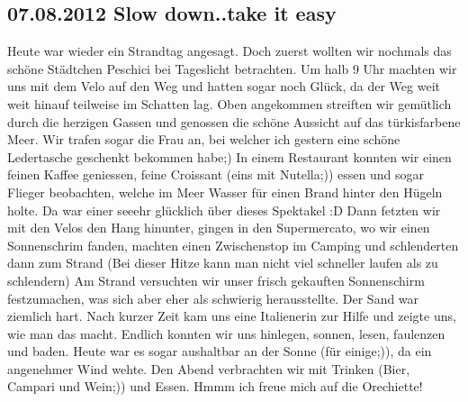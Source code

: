 \subsection{07.08.2012 Slow down..take it easy}
Heute war wieder ein Strandtag angesagt.
Doch zuerst wollten wir nochmals das schöne Städtchen Peschici bei Tageslicht betrachten.
Um halb 9 Uhr machten wir uns mit dem Velo auf den Weg und hatten sogar noch Glück, da der Weg weit weit hinauf teilweise im Schatten lag.
Oben angekommen streiften wir gemütlich durch die herzigen Gassen und genossen die schöne Aussicht auf das türkisfarbene Meer.
Wir trafen sogar die Frau an, bei welcher ich gestern eine schöne Ledertasche geschenkt bekommen habe;) In einem Restaurant konnten wir einen feinen Kaffee geniessen, feine Croissant (eins mit Nutella;)) essen und sogar Flieger beobachten, welche im Meer Wasser für einen Brand hinter den Hügeln holte.
Da war einer seeehr glücklich über dieses Spektakel :D Dann fetzten wir mit den Velos den Hang hinunter, gingen in den Supermercato, wo wir einen Sonnenschrim fanden, machten einen Zwischenstop im Camping und schlenderten dann zum Strand (Bei dieser Hitze kann man nicht viel schneller laufen als zu schlendern) Am Strand versuchten wir unser frisch gekauften Sonnenschirm festzumachen, was sich aber eher als schwierig herausstellte.
Der Sand war ziemlich hart.
Nach kurzer Zeit kam uns eine Italienerin zur Hilfe und zeigte uns, wie man das macht.
Endlich konnten wir uns hinlegen, sonnen, lesen, faulenzen und baden.
Heute war es sogar aushaltbar an der Sonne (für einige;)), da ein angenehmer Wind wehte.
Den Abend verbrachten wir mit Trinken (Bier, Campari und Wein;)) und Essen.
Hmmm ich freue mich auf die Orechiette!  

